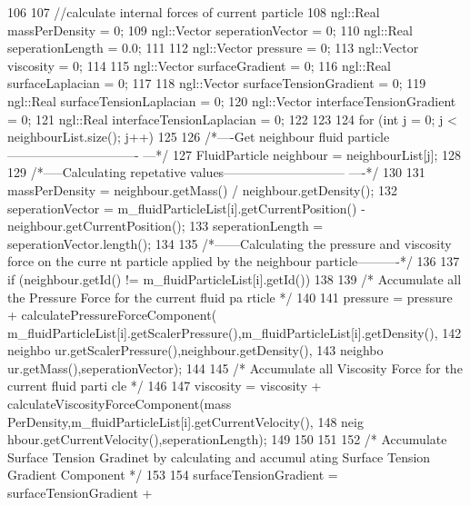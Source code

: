\begin{DoxyCode}
{{{106 
107         //calculate internal forces of current particle
108         ngl::Real massPerDensity = 0;
109         ngl::Vector seperationVector = 0;
110         ngl::Real seperationLength = 0.0;
111 
112         ngl::Vector pressure = 0;
113         ngl::Vector viscosity = 0;
114 
115         ngl::Vector surfaceGradient = 0;
116         ngl::Real surfaceLaplacian = 0;
117 
118         ngl::Vector surfaceTensionGradient = 0;
119         ngl::Real surfaceTensionLaplacian = 0;
120         ngl::Vector interfaceTensionGradient = 0;
121         ngl::Real interfaceTensionLaplacian = 0;
122 
123 
124             for (int j = 0; j < neighbourList.size(); j++)
125             {
126                 /*----Get neighbour fluid particle-------------------------------
      ---*/
127                 FluidParticle neighbour = neighbourList[j];
128 
129                 /*-----Calculating repetative values-----------------------------
      ----*/
130 
131                 massPerDensity = neighbour.getMass() / neighbour.getDensity();
132                 seperationVector = m_fluidParticleList[i].getCurrentPosition() - 
      neighbour.getCurrentPosition();
133                 seperationLength = seperationVector.length();
134 
135                 /*------Calculating the pressure and viscosity force on the curre
      nt particle applied by the neighbour particle----------*/
136 
137                 if (neighbour.getId() != m_fluidParticleList[i].getId())
138                 {
139                     /* Accumulate all the Pressure Force for the current fluid pa
      rticle */
140 
141                     pressure = pressure + calculatePressureForceComponent(
      m_fluidParticleList[i].getScalerPressure(),m_fluidParticleList[i].getDensity(),
142                                                                           neighbo
      ur.getScalerPressure(),neighbour.getDensity(),
143                                                                           neighbo
      ur.getMass(),seperationVector);
144 
145                     /* Accumulate all Viscosity Force for the current fluid parti
      cle */
146 
147                     viscosity = viscosity + calculateViscosityForceComponent(mass
      PerDensity,m_fluidParticleList[i].getCurrentVelocity(),
148                                                                              neig
      hbour.getCurrentVelocity(),seperationLength);
149 
150                 }
151 
152                 /* Accumulate Surface Tension Gradinet by calculating and accumul
      ating Surface Tension Gradient Component */
153 
154                 surfaceTensionGradient = surfaceTensionGradient +
}}}}
\end{DoxyCode}
